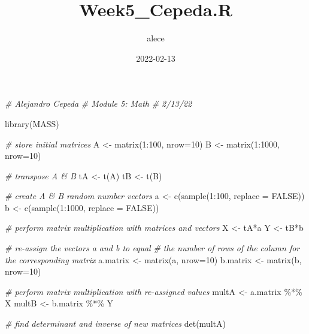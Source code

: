 \documentclass[
]{article}
\title{Week5\_Cepeda.R}
\author{alece}
\date{2022-02-13}
\newenvironment{Shaded}{\begin{snugshade}}{\end{snugshade}}
\newcommand{\AttributeTok}[1]{\textcolor[rgb]{0.77,0.63,0.00}{#1}}
\newcommand{\CommentTok}[1]{\textcolor[rgb]{0.56,0.35,0.01}{\textit{#1}}}
\newcommand{\ConstantTok}[1]{\textcolor[rgb]{0.00,0.00,0.00}{#1}}
\newcommand{\DecValTok}[1]{\textcolor[rgb]{0.00,0.00,0.81}{#1}}
\newcommand{\FunctionTok}[1]{\textcolor[rgb]{0.00,0.00,0.00}{#1}}
\newcommand{\NormalTok}[1]{#1}
\newcommand{\OtherTok}[1]{\textcolor[rgb]{0.56,0.35,0.01}{#1}}
\newcommand{\SpecialCharTok}[1]{\textcolor[rgb]{0.00,0.00,0.00}{#1}}
\begin{document}
\maketitle

\begin{Shaded}
\begin{Highlighting}[]
\CommentTok{\# Alejandro Cepeda}
\CommentTok{\# Module 5: Math}
\CommentTok{\# 2/13/22}

\FunctionTok{library}\NormalTok{(MASS)}

\CommentTok{\# store initial matrices}
\NormalTok{A }\OtherTok{\textless{}{-}} \FunctionTok{matrix}\NormalTok{(}\DecValTok{1}\SpecialCharTok{:}\DecValTok{100}\NormalTok{, }\AttributeTok{nrow=}\DecValTok{10}\NormalTok{)}
\NormalTok{B }\OtherTok{\textless{}{-}} \FunctionTok{matrix}\NormalTok{(}\DecValTok{1}\SpecialCharTok{:}\DecValTok{1000}\NormalTok{, }\AttributeTok{nrow=}\DecValTok{10}\NormalTok{)}

\CommentTok{\# transpose A \& B}
\NormalTok{tA }\OtherTok{\textless{}{-}} \FunctionTok{t}\NormalTok{(A)}
\NormalTok{tB }\OtherTok{\textless{}{-}} \FunctionTok{t}\NormalTok{(B)}

\CommentTok{\# create A \& B random number vectors}
\NormalTok{a }\OtherTok{\textless{}{-}} \FunctionTok{c}\NormalTok{(}\FunctionTok{sample}\NormalTok{(}\DecValTok{1}\SpecialCharTok{:}\DecValTok{100}\NormalTok{, }\AttributeTok{replace =} \ConstantTok{FALSE}\NormalTok{))}
\NormalTok{b }\OtherTok{\textless{}{-}} \FunctionTok{c}\NormalTok{(}\FunctionTok{sample}\NormalTok{(}\DecValTok{1}\SpecialCharTok{:}\DecValTok{1000}\NormalTok{, }\AttributeTok{replace =} \ConstantTok{FALSE}\NormalTok{))}

\CommentTok{\# perform matrix multiplication with matrices and vectors}
\NormalTok{X }\OtherTok{\textless{}{-}}\NormalTok{ tA}\SpecialCharTok{*}\NormalTok{a}
\NormalTok{Y }\OtherTok{\textless{}{-}}\NormalTok{ tB}\SpecialCharTok{*}\NormalTok{b}

\CommentTok{\# re{-}assign the vectors a and b to equal }
\CommentTok{\# the number of rows of the column for the corresponding matrix}
\NormalTok{a.matrix }\OtherTok{\textless{}{-}} \FunctionTok{matrix}\NormalTok{(a, }\AttributeTok{nrow=}\DecValTok{10}\NormalTok{)}
\NormalTok{b.matrix }\OtherTok{\textless{}{-}} \FunctionTok{matrix}\NormalTok{(b, }\AttributeTok{nrow=}\DecValTok{10}\NormalTok{)}

\CommentTok{\# perform matrix multiplication with re{-}assigned values}
\NormalTok{multA }\OtherTok{\textless{}{-}}\NormalTok{ a.matrix }\SpecialCharTok{\%*\%}\NormalTok{ X}
\NormalTok{multB }\OtherTok{\textless{}{-}}\NormalTok{ b.matrix }\SpecialCharTok{\%*\%}\NormalTok{ Y}

\CommentTok{\# find determinant and inverse of new matrices}
\FunctionTok{det}\NormalTok{(multA)}
\end{Highlighting}
\end{Shaded}
\end{document}
